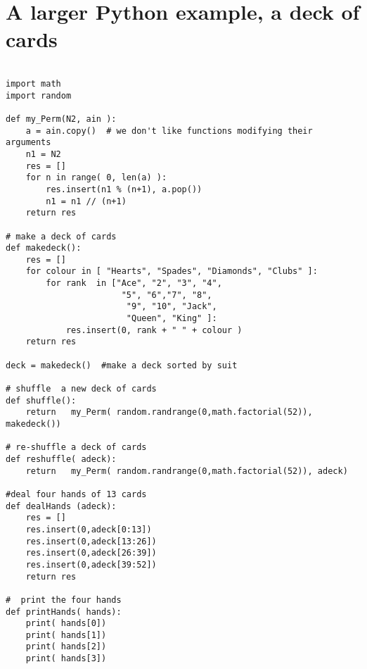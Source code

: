 \documentclass{article} %
\begin{document}
\newpage

  \section{A larger Python example, a deck of cards} %
\begin{lstlisting}

import math
import random

def my_Perm(N2, ain ):
	a = ain.copy()  # we don't like functions modifying their arguments
	n1 = N2
	res = []
	for n in range( 0, len(a) ):
		res.insert(n1 % (n+1), a.pop())
		n1 = n1 // (n+1)
	return res

# make a deck of cards
def makedeck():
	res = []
	for colour in [ "Hearts", "Spades", "Diamonds", "Clubs" ]:
		for rank  in ["Ace", "2", "3", "4",
                       "5", "6","7", "8", 
                        "9", "10", "Jack", 
                        "Queen", "King" ]:
			res.insert(0, rank + " " + colour )
	return res

deck = makedeck()  #make a deck sorted by suit

# shuffle  a new deck of cards
def shuffle():
	return   my_Perm( random.randrange(0,math.factorial(52)), makedeck())	

# re-shuffle a deck of cards
def reshuffle( adeck):
	return   my_Perm( random.randrange(0,math.factorial(52)), adeck)	

#deal four hands of 13 cards
def dealHands (adeck):
	res = []
	res.insert(0,adeck[0:13])	
	res.insert(0,adeck[13:26])	
	res.insert(0,adeck[26:39])	
	res.insert(0,adeck[39:52])
	return res	

#  print the four hands
def printHands( hands):
	print( hands[0])
	print( hands[1])
	print( hands[2])
	print( hands[3])
		

\end{lstlisting}
\newpage
\end{document}
